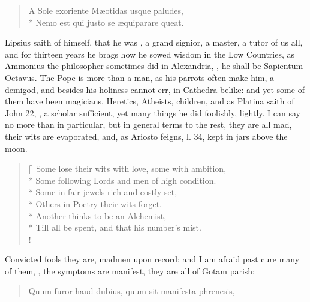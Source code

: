 {\begin{verse}
\textlatin{A Sole exoriente M\ae{}otidas usque paludes,}\\*
\textlatin{Nemo est qui justo se \ae{}quiparare queat.}
\end{verse}

Lipsius saith of himself, that he was , a grand signior, a master, a tutor of us all,
and for thirteen years he brags how he sowed wisdom in the Low
Countries, as Ammonius the philosopher sometimes did in Alexandria,
, he shall be \textlatin{Sapientum Octavus}. The Pope is more than a man,
as his parrots often make him, a demigod, and besides his holiness
cannot err, in Cathedra belike: and yet some of them have been
magicians, Heretics, Atheists, children, and as Platina saith of John
22, , a scholar sufficient,
yet many things he did foolishly, lightly. I can say no more than in
particular, but in general terms to the rest, they are all mad, their
wits are evaporated, and, as Ariosto feigns, l. 34, kept in jars above
the moon.

\settowidth{\versewidth}{Till all be spent, and that his number's mist.}
\begin{verse}[\versewidth]
Some lose their wits with love, some with ambition,\\*
Some following Lords and men of high condition.\\*
Some in fair jewels rich and costly set,\\*
Others in Poetry their wits forget.\\*
Another thinks to be an Alchemist,\\*
Till all be spent, and that his number's mist.\\!
\end{verse}

Convicted fools they are, madmen upon record; and I am afraid past cure
many of them, , the symptoms are manifest, they are
all of Gotam parish:

\begin{quote}
\textlatin{Quum furor haud dubius, quum sit manifesta phrenesis,}
\end{quote}

}
